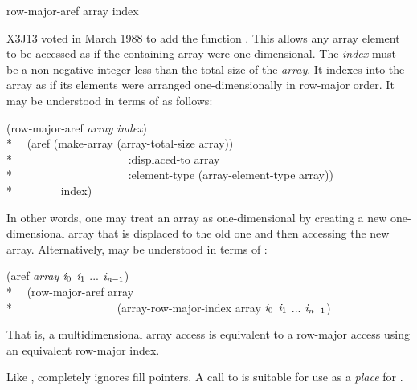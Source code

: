 \begin{new}
\begin{defun}[Function]
row-major-aref array index

X3J13 voted in March 1988
to add the function .
This allows any array element to be accessed as if the containing array
were one-dimensional.  The \emph{index} must be a non-negative integer
less than the total size of the \emph{array}.  It indexes into the array as
if its elements were arranged one-dimensionally in row-major order.
It may be understood in terms of  as follows:
\begin{lisp}
(row-major-aref \emph{array} \emph{index}) \EQ \\*
~~(aref (make-array (array-total-size array)) \\*
~~~~~~~~~~~~~~~~~~~~:displaced-to array \\*
~~~~~~~~~~~~~~~~~~~~:element-type (array-element-type array)) \\*
~~~~~~~~index)
\end{lisp}
In other words, one may treat an array as one-dimensional by creating
a new one-dimensional array that is displaced to the old one and then
accessing the new array.
Alternatively,  may be understood in terms of :
\begin{lisp}
(aref \emph{array} $\emph{i}_0$ $\emph{i}_1$ ... $\emph{i}_{\hbox{\scriptsize\it n}-1}$) \EQ \\*
~~(row-major-aref array \\*
~~~~~~~~~~~~~~~~~~(array-row-major-index array $\emph{i}_0$ $\emph{i}_1$ ... $\emph{i}_{\hbox{\scriptsize\it n}-1}$)
\end{lisp}
That is, a multidimensional array access is equivalent to a row-major access
using an equivalent row-major index.

Like ,  completely ignores fill pointers.
A call to  is suitable for use as a \emph{place} for .


\end{defun}
\end{new}
